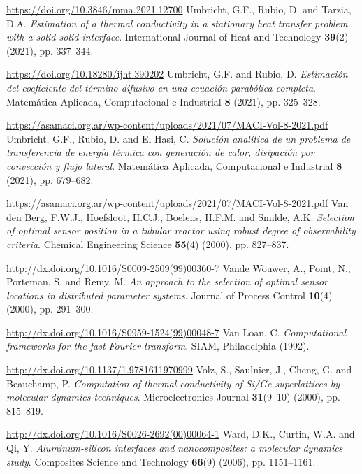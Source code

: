 \begin{thebibliography}{301}
\url{https://doi.org/10.3846/mma.2021.12700}
%
%
 Umbricht, G.F., Rubio, D. and Tarzia, D.A. {\it Estimation of a thermal conductivity in a stationary heat transfer problem with a solid-solid interface}. International Journal of Heat and Technology {\bf 39}(2) (2021), pp. 337--344.

\url{https://doi.org/10.18280/ijht.390202}
%
%
 Umbricht, G.F. and Rubio, D. {\it Estimaci\'on del coeficiente del t\'ermino difusivo en una ecuaci\'on parab\'olica completa}. Matem\'atica Aplicada, Computacional e Industrial {\bf 8} (2021), pp. 325--328.

\url{https://asamaci.org.ar/wp-content/uploads/2021/07/MACI-Vol-8-2021.pdf}
%
%
 Umbricht, G.F., Rubio, D. and El Hasi, C. {\it Soluci\'on anal\'itica de un problema de transferencia de energ\'ia t\'ermica con generaci\'on de calor, disipaci\'on por convecci\'on y flujo lateral}. Matem\'atica Aplicada, Computacional e Industrial {\bf 8} (2021), pp. 679--682. 

\url{https://asamaci.org.ar/wp-content/uploads/2021/07/MACI-Vol-8-2021.pdf}
%
%
 Van den Berg, F.W.J., Hoefsloot, H.C.J., Boelens, H.F.M. and Smilde, A.K. {\it Selection of optimal sensor position in a tubular reactor using robust degree of observability criteria}. Chemical Engineering Science {\bf 55}(4) (2000), pp. 827--837.

\url{http://dx.doi.org/10.1016/S0009-2509(99)00360-7}
%
%
 Vande Wouwer, A., Point, N., Porteman, S. and Remy, M. {\it An approach to the selection of optimal sensor locations in distributed parameter systems}. Journal of Process Control {\bf 10}(4) (2000), pp. 291--300.

\url{http://dx.doi.org/10.1016/S0959-1524(99)00048-7}
%
%
 Van Loan, C. {\it Computational frameworks for the fast Fourier transform}. SIAM, Philadelphia (1992).

\url{http://dx.doi.org/10.1137/1.9781611970999}
%
%
 Volz, S., Saulnier, J., Cheng, G. and Beauchamp, P. {\it Computation of thermal conductivity of Si/Ge superlattices by molecular dynamics techniques}. Microelectronics Journal {\bf 31}(9--10) (2000), pp. 815--819.

\url{http://dx.doi.org/10.1016/S0026-2692(00)00064-1}
%
%
 Ward, D.K., Curtin, W.A. and Qi, Y. {\it Aluminum-silicon interfaces and nanocomposites: a molecular dynamics study}. Composites Science and Technology {\bf 66}(9) (2006), pp. 1151--1161.


\end{thebibliography}
